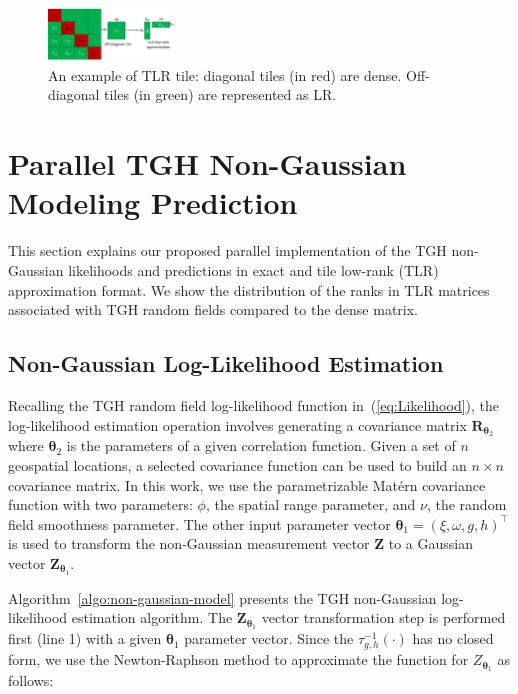 \documentclass[conference]{IEEEtran}
\begin{document}
\begin{figure}[h]
\centering
\includegraphics[width=0.30\textwidth]{./figures/tlr_graph.pdf}
\caption{An example of TLR  tile: diagonal tiles (in red) are dense. Off-diagonal tiles (in green) are represented as
LR.}
\label{fig:tlr-structure}
\end{figure}

\section{Parallel TGH Non-Gaussian Modeling Prediction}

This section explains our proposed parallel
implementation of the TGH non-Gaussian likelihoods
and predictions in exact and tile low-rank (TLR) approximation
format. We show the
distribution of the ranks in TLR matrices
associated with TGH random fields compared to the dense matrix.



\subsection{Non-Gaussian Log-Likelihood Estimation}
Recalling the TGH random field log-likelihood function
in~(\ref{eq:Likelihood}), the log-likelihood estimation
operation involves generating a covariance 
matrix $\bm{R}_{\bm{\theta}_2}$ where $\bm{\theta}_2$ is the parameters of 
a given correlation function. Given a set of $n$ geospatial
locations, a selected covariance function can be used to
build an $n \times n$ covariance matrix. In this work, we
use the parametrizable Mat\'ern covariance function with
two parameters: $\phi$, the spatial range parameter, 
and $\nu$, the random field smoothness parameter.  
The other input parameter vector $\bm{\theta}_1= (\xi, \omega, g, h)^\top$ 
is used to transform the non-Gaussian measurement 
vector $\bm{Z}$  to a Gaussian vector $\bm{Z}_{\bm{\theta}_1}$. 

Algorithm~\ref{algo:non-gaussian-model} presents the
TGH non-Gaussian log-likelihood estimation algorithm. 
The $\bm{Z}_{\bm{\theta}_1}$ vector transformation step
is performed first (line 1) with a given $\bm{\theta}_1$ parameter vector. Since the $\tau_{g,h}^{-1}(\cdot)$ has
no closed form, we use the Newton-Raphson method to
approximate the function for $Z_{\bm{\theta}_1}$ as follows:
\end{document}
